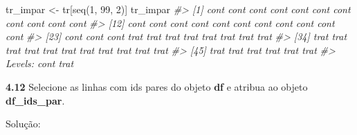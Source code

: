 \documentclass[
]{book}
\newenvironment{Shaded}{\begin{snugshade}}{\end{snugshade}}
\newcommand{\CommentTok}[1]{\textcolor[rgb]{0.56,0.35,0.01}{\textit{#1}}}
\newcommand{\DecValTok}[1]{\textcolor[rgb]{0.00,0.00,0.81}{#1}}
\newcommand{\FunctionTok}[1]{\textcolor[rgb]{0.00,0.00,0.00}{#1}}
\newcommand{\NormalTok}[1]{#1}
\newcommand{\OtherTok}[1]{\textcolor[rgb]{0.56,0.35,0.01}{#1}}
\begin{document}
\begin{Shaded}
\begin{Highlighting}[]
\NormalTok{tr\_impar }\OtherTok{\textless{}{-}}\NormalTok{ tr[}\FunctionTok{seq}\NormalTok{(}\DecValTok{1}\NormalTok{, }\DecValTok{99}\NormalTok{, }\DecValTok{2}\NormalTok{)]}
\NormalTok{tr\_impar}
\CommentTok{\#\textgreater{}  [1] cont cont cont cont cont cont cont cont cont cont cont}
\CommentTok{\#\textgreater{} [12] cont cont cont cont cont cont cont cont cont cont cont}
\CommentTok{\#\textgreater{} [23] cont cont cont trat trat trat trat trat trat trat trat}
\CommentTok{\#\textgreater{} [34] trat trat trat trat trat trat trat trat trat trat trat}
\CommentTok{\#\textgreater{} [45] trat trat trat trat trat trat}
\CommentTok{\#\textgreater{} Levels: cont trat}
\end{Highlighting}
\end{Shaded}

\textbf{4.12}
Selecione as linhas com ids pares do objeto \textbf{df} e atribua ao objeto \textbf{df\_ids\_par}.

Solução:
\end{document}
